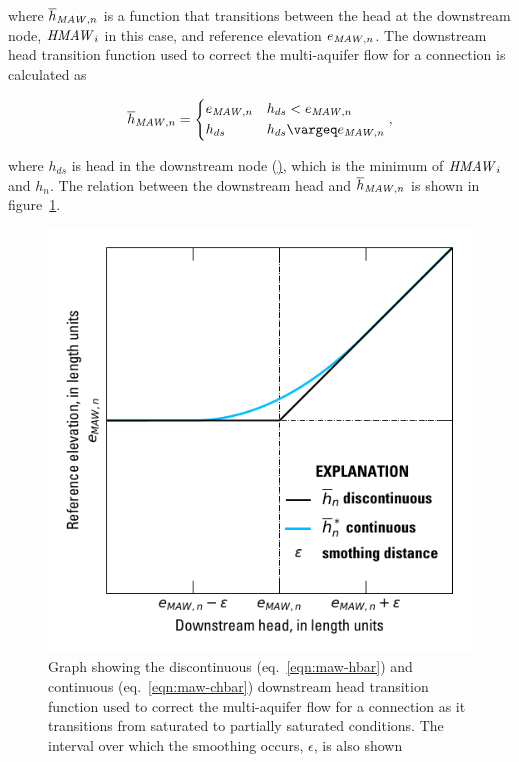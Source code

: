 \noindent where $\overline{h}_{\mathit{MAW},n}$ is a function that transitions between the head at the downstream node, $\mathit{HMAW}_{i}$ in this case, and reference elevation $e_{\mathit{MAW},n}$. The downstream head transition function used to correct the multi-aquifer flow for a connection is calculated as

\begin{align}
	\label{eqn:maw-hbar}
	\overline{h}_{\mli{MAW},n} = \begin{dcases}
		e_{\mli{MAW},n} &  h_{ds} < e_{\mli{MAW},n} \\
		h_{ds} & h_{ds} \ge e_{\mli{MAW},n}
	\end{dcases} ,
\end{align}

\noindent where $h_{ds}$ is head in the downstream node (\ul), which is the minimum of $\mathit{HMAW}_{i}$ and $h_n$. The relation between the downstream head and $\overline{h}_{\mathit{MAW},n}$ is shown in figure~\ref{fig:mawhbar}.

\begin{figure}[!ht]
	\begin{center}
	\includegraphics{./Figures/MAWDischargeCorrection.pdf}
	\caption[Graph showing the downstream head transition functions used to correct the multi-aquifer flow for a connection]{Graph showing the discontinuous (eq.~\ref{eqn:maw-hbar}) and continuous (eq.~\ref{eqn:maw-chbar})  downstream head transition function used to correct the multi-aquifer flow for a connection as it transitions from saturated to partially saturated conditions. The interval over which the smoothing occurs, $\epsilon$, is also shown}
	\label{fig:mawhbar}
	\end{center}
\end{figure}

